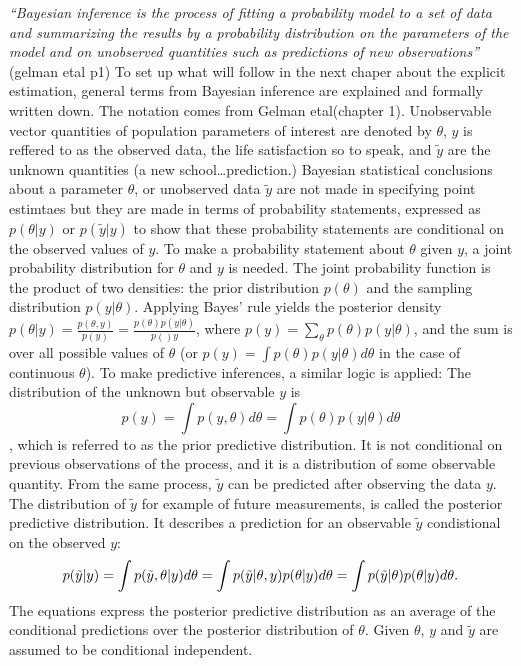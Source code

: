 \documentclass[a4, 12pt]{article}
\begin{document}
\emph{``Bayesian inference is the process of fitting a probability model to a set of data and summarizing the results by a probability distribution on the parameters of the model and on unobserved quantities such as predictions of new observations''} (gelman etal p1)
To set up what will follow in the next chaper about the explicit estimation, general terms from Bayesian inference are explained and formally written down. The notation comes from Gelman etal(chapter 1).
Unobservable vector quantities of population parameters of interest are denoted by \(\theta\), \(y\) is reffered to as the observed data, the life satisfaction so to speak, and \(\tilde{y}\) are the unknown quantities (a new school\ldots prediction.) Bayesian statistical conclusions about a parameter \(\theta\), or unobserved data \(\tilde{y}\) are not made in specifying point estimtaes but they are made in terms of probability statements, expressed as \(p(\theta|y)\) or \(p(\tilde y|y)\) to show that these probability statements are conditional on the observed values of \(y\).
To make a probability statement about \(\theta\) given \(y\), a joint probability distribution for \(\theta\) and \(y\) is needed. The joint probability function is the product of two densities: the prior distribution \(p(\theta)\) and the sampling distribution \(p(y|\theta)\). Applying Bayes' rule yields the posterior density \(p(\theta|y)=\frac{p(\theta,y)}{p(y)}=\frac{p(\theta)p(y|\theta)}{p()y}\),
where \(p(y)=\sum_\theta{p(\theta)p(y|\theta)}\), and the sum is over all possible values of \(\theta\) (or \(p(y)=\int p(\theta)p(y|\theta)d\theta\) in the case of continuous \(\theta\)).
To make predictive inferences, a similar logic is applied:
The distribution of the unknown but observable \(y\) is
\[p(y)=\int p(y,\theta)d\theta=\int p(\theta)p(y|\theta)d\theta\], which is referred to as the prior predictive distribution. It is not conditional on previous observations of the process, and it is a distribution of some observable quantity.
From the same process, \(\tilde{y}\) can be predicted after observing the data \(y\).
The distribution of \(\tilde{y}\) for example of future measurements, is called the posterior predictive distribution. It describes a prediction for an observable \(\tilde{y}\) condistional on the observed \(y\):
\[p(\tilde{y}|y)=\int p(\tilde{y},\theta|y)d\theta \\
= \int p(\tilde{y}|\theta,y)p(\theta|y)d\theta \\
= \int p(\tilde{y}|\theta)p(\theta|y)d\theta.\]
The equations express the posterior predictive distribution as an average of the conditional predictions over the posterior distribution of \(\theta\). Given \(\theta\), \(y\) and \(\tilde{y}\) are assumed to be conditional independent.
\end{document}
